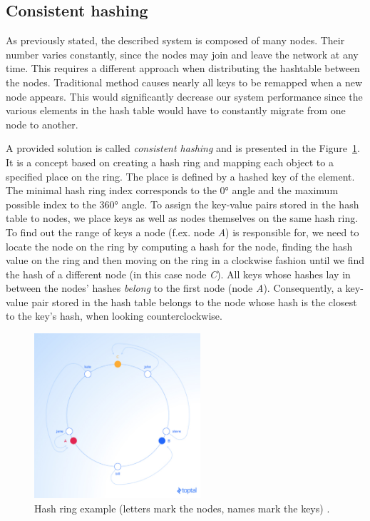     \subsection{Consistent hashing}
        As previously stated, the described system is composed of many nodes. Their number varies constantly, since the nodes may join and leave the network at any time. This requires a different approach when distributing the hashtable between the nodes. Traditional method causes nearly all keys to be remapped when a new node appears. This would significantly decrease our system performance since the various elements in the hash table would have to constantly migrate from one node to another.
        
        A provided solution is called \textit{consistent hashing} and is presented in the Figure~\ref{ConsistentHashingImage1}. It is a concept based on creating a hash ring and mapping each object to a specified place on the ring. The place is defined by a hashed key of the element. The minimal hash ring index corresponds to the \ang{0} angle and the maximum possible index to the \ang{360} angle. To assign the key-value pairs stored in the hash table to nodes, we place keys as well as nodes themselves on the same hash ring. To find out the range of keys a node (f.ex. node \textit{A}) is responsible for, we need to locate the node on the ring by computing a hash for the node, finding the hash value on the ring and then moving on the ring in a clockwise fashion until we find the hash of a different node (in this case node \textit{C}). All keys whose hashes lay in between the nodes' hashes \emph{belong} to the first node (node \emph{A}). Consequently, a key-value pair stored in the hash table belongs to the node whose hash is the closest to the key's hash, when looking counterclockwise.
        
        \begin{figure}[ht]
            \centering
            \includegraphics[width=0.55\textwidth]{thesis/figures/hashring.png}  
            \caption{Hash ring example (letters mark the nodes, names mark the keys) \cite{ConsistentHashing}.}
            \label{ConsistentHashingImage1}
        \end{figure}
        
